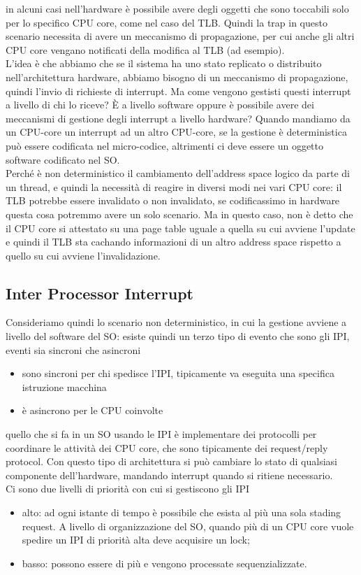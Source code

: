\documentclass[12pt, oneside]{extbook}
\begin{document}
in alcuni casi nell'hardware è possibile avere degli oggetti che sono toccabili solo per lo specifico CPU core, come nel caso del TLB. Quindi la trap in questo scenario necessita di avere un meccanismo di propagazione, per cui anche gli altri CPU core vengano notificati della modifica al TLB (ad esempio).\\L'idea è che abbiamo che se il sistema ha uno stato replicato o distribuito nell'architettura hardware, abbiamo bisogno di un meccanismo di propagazione, quindi l'invio di richieste di interrupt. Ma come vengono gestisti questi interrupt a livello di chi lo riceve? È a livello software oppure è possibile avere dei meccanismi di gestione degli interrupt a livello hardware? Quando mandiamo da un CPU-core un interrupt ad un altro CPU-core, se la gestione è deterministica può essere codificata nel micro-codice, altrimenti ci deve essere un oggetto software codificato nel SO.\\Perché è non deterministico il cambiamento dell'address space logico da parte di un thread, e quindi la necessità di reagire in diversi modi nei vari CPU core: il TLB potrebbe essere invalidato o non invalidato, se codificassimo in hardware questa cosa potremmo avere un solo scenario. Ma in questo caso, non è detto che il CPU core si attestato su una page table uguale a quella su cui avviene l'update e quindi il TLB sta cachando informazioni di un altro address space rispetto a quello su cui avviene l'invalidazione.
\subsection{Inter Processor Interrupt}
Consideriamo quindi lo scenario non deterministico, in cui la gestione avviene a livello del software del SO: esiste quindi un terzo tipo di evento che sono gli IPI, eventi sia sincroni che asincroni
\begin{itemize}
\item sono sincroni per chi spedisce l'IPI, tipicamente va eseguita una specifica istruzione macchina
\item è asincrono per le CPU coinvolte
\end{itemize}
quello che si fa in un SO usando le IPI è implementare dei protocolli per coordinare le attività dei CPU core, che sono tipicamente dei request/reply protocol. Con questo tipo di architettura si può cambiare lo stato di qualsiasi componente dell'hardware, mandando interrupt quando si ritiene necessario.\\Ci sono due livelli di priorità con cui si gestiscono gli IPI
\begin{itemize}
\item alto: ad ogni istante di tempo è possibile che esista al più una sola stading request. A livello di organizzazione del SO, quando più di un CPU core vuole spedire un IPI di priorità alta deve acquisire un lock;
\item basso: possono essere di più e vengono processate sequenzializzate.
\end{itemize} 
\end{document}
